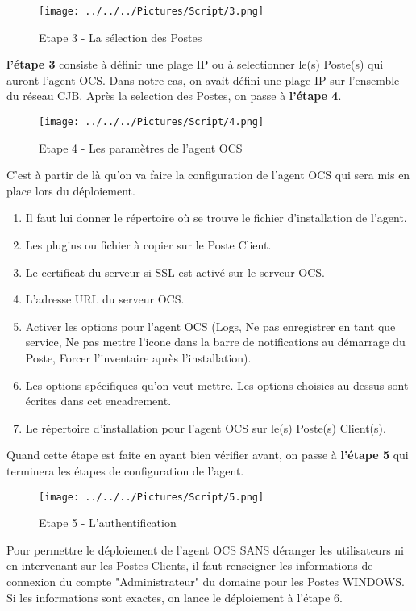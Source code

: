 \documentclass[11pt,a4paper,oneside]{article}
\begin{document}
\begin{figure}[hbtp]
 \centering
 \texttt{[image: ../../../Pictures/Script/3.png]}
 \caption{Etape 3 - La sélection des Postes}
 \end{figure}
  
\textbf{l'étape 3} consiste à définir une plage IP  ou à selectionner le(s) Poste(s) qui auront l'agent OCS. Dans notre cas, on avait défini une plage IP sur l'ensemble du réseau CJB. Après la selection des Postes, on passe à \textbf{l'étape 4}.
\newpage

\begin{figure}[hbtp]
\centering
\texttt{[image: ../../../Pictures/Script/4.png]}
\caption{Etape 4 - Les paramètres de l'agent OCS}
\end{figure}

C'est à partir de là qu'on va faire la configuration de l'agent OCS qui sera mis en place lors du déploiement.  
\begin{enumerate}
\item Il faut lui donner le répertoire où se trouve le fichier d'installation de l'agent.
\item Les plugins ou fichier à copier sur le Poste Client.
\item Le certificat du serveur si SSL est activé sur le serveur OCS.
\item L'adresse URL du serveur OCS.
\item Activer les options pour l'agent OCS (Logs, Ne pas enregistrer en tant que service, Ne pas mettre l'icone dans la barre de notifications au démarrage du Poste, Forcer l'inventaire après l'installation).
\item Les options spécifiques qu'on veut mettre. Les options choisies au dessus sont écrites dans cet encadrement.
\item Le répertoire d'installation pour l'agent OCS sur le(s) Poste(s) Client(s).
\end{enumerate}
Quand cette étape est faite en ayant bien vérifier avant, on passe à \textbf{l'étape 5} qui terminera les étapes de configuration de l'agent.
\newpage
\begin{figure}[hbtp]
\centering
\texttt{[image: ../../../Pictures/Script/5.png]}
\caption{Etape 5 - L'authentification}
\end{figure}

Pour permettre le déploiement de l'agent OCS SANS déranger les utilisateurs ni en intervenant sur les Postes Clients, il faut renseigner les informations de connexion du compte "Administrateur" du domaine pour les Postes WINDOWS. Si les informations sont exactes, on lance le déploiement à l'étape 6.
\end{document}
